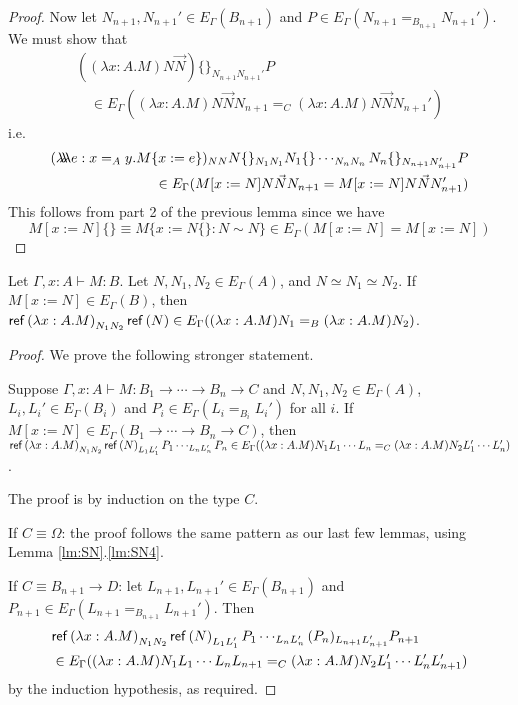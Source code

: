 \begin{proof}
Now let $N_{n+1}, N_{n+1}' \in E_\Gamma(B_{n+1})$ and $P \in E_\Gamma(N_{n+1} =_{B_{n+1}} N_{n+1}')$.  We must show that
\begin{align*}
((\lambda x:A.M)N \vec{N}) \{\}_{N_{n+1}N_{n+1}'}P \\
\quad \in E_\Gamma((\lambda x:A.M) N \vec{N} N_{n+1} =_C (\lambda x:A.M) N \vec{N} N_{n+1}')
\end{align*}
i.e.
\begin{align*}
(\lambda \!\! \lambda \!\! \lambda e:x =_A y . M \{ x:=e \})_{NN} N \{ \}_{N_1 N_1} N_1\{\} \cdots_{N_n N_n} N_n\{\}_{N_{n+1} N_{n+1}'} P \\
\quad \in E_\Gamma(M[x:=N] N \vec{N} N_{n+1} = M[x:=N] N \vec{N} N_{n+1}')
\end{align*}
This follows from part 2 of the previous lemma since we have
\[ M[x:=N]\{\} \equiv M \{ x:= N \{ \} : N \sim N \} \in E_\Gamma(M[x:=N] = M[x:=N]) \]
\end{proof}

\begin{lm}
\label{lm:wte3}
Let $\Gamma, x : A \vdash M : B$.  Let $N, N_1, N_2 \in E_\Gamma(A)$, and $N \simeq N_1 \simeq N_2$.  If $M[x:=N] \in E_\Gamma(B)$,
then $\mathsf{ref} \left( {\lambda x:A.M} \right)_{N_1 N_2} \mathsf{ref} \left( {N} \right) \in E_\Gamma((\lambda x:A.M)N_1 =_B (\lambda x:A.M) N_2)$.
\end{lm}

\begin{proof}
We prove the following stronger statement.

Suppose $\Gamma, x : A \vdash M : B_1 \rightarrow \cdots \rightarrow B_n \rightarrow C$ and $N, N_1, N_2 \in E_\Gamma(A)$,
$L_i, L_i' \in E_\Gamma(B_i)$ and $P_i \in E_\Gamma(L_i =_{B_i} L_i')$ for all $i$.  If $M[x:=N] \in E_\Gamma(B_1 \rightarrow \cdots \rightarrow B_n \rightarrow C)$,
then $\mathsf{ref} \left( {\lambda x:A.M} \right)_{N_1 N_2} \mathsf{ref} \left( {N} \right)_{L_1 L_1'} P_1 \cdots_{L_n L_n'} P_n \in E_\Gamma((\lambda x:A.M) N_1 L_1 \cdots L_n =_C (\lambda x:A.M) N_2 L_1' \cdots L_n')$.

The proof is by induction on the type $C$.

If $C \equiv \Omega$: the proof follows the same pattern as our last few lemmas, using Lemma \ref{lm:SN}.\ref{lm:SN4}.

If $C \equiv B_{n+1} \rightarrow D$: let $L_{n+1}, L_{n+1}' \in E_\Gamma(B_{n+1})$ and $P_{n+1} \in E_\Gamma(L_{n+1} =_{B_{n+1}} L_{n+1}')$.  Then
\begin{align*}
\lefteqn{\reff{\lambda x:A.M}_{N_1 N_2} \reff{N}_{L_1 L_1'} P_1 \cdots_{L_n L_n'} (P_n)_{L_{n+1} L_{n+1}'} P_{n+1}} \\
\quad &\in E_\Gamma((\lambda x:A.M) N_1 L_1 \cdots L_n L_{n+1} =_C (\lambda x:A.M) N_2 L_1' \cdots L_n'
L_{n+1}')
\end{align*}
by the induction hypothesis, as required.
\end{proof}

